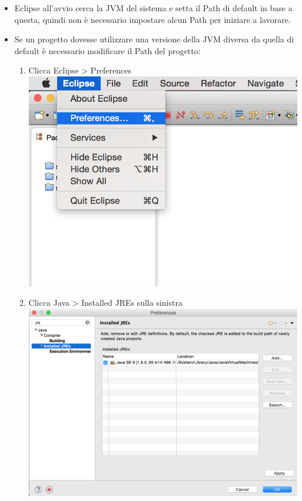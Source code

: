 \documentclass{article}
\begin{document}
\begin{itemize}
\item Eclipse all'avvio cerca la JVM del sistema  e setta il Path di default in base a  questa, quindi non \`e necessario  impostare alcun Path per iniziare a  lavorare.
\item Se un progetto dovesse utilizzare una versione della JVM diversa
  da quella di  default \`e necessario modificare il Path del
  progetto:
\begin{enumerate}
\item Clicca Eclipse > Preferences\\
\includegraphics[scale=0.5]{img/01.png}
\item Clicca Java > Installed JREs sulla sinistra\\
\includegraphics[scale=0.5]{img/02.png}

\end{enumerate}
\end{itemize}
\end{document}
